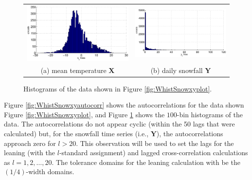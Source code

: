 \documentclass{article}[10pt]
\begin{document}
\begin{figure}[ht]
\begin{tabular}{cc}
\includegraphics[scale=0.5]{WhistlerDailyExample_Xhist.eps} & \includegraphics[scale=0.5]{WhistlerDailyExample_Yhist.eps} \\
(a) mean temperature $\mathbf{X}$ & (b) daily snowfall $\mathbf{Y}$
\end{tabular}
\caption{Histograms of the data shown in Figure \ref{fig:WhistSnowxyplot}.}
\label{fig:WhistSnowxyhist}
\end{figure}

Figure \ref{fig:WhistSnowxyautocorr} shows the autocorrelations for the data shown Figure \ref{fig:WhistSnowxyplot}, and Figure \ref{fig:WhistSnowxyhist} shows the $100$-bin histograms of the data.  The autocorrelations do not appear cyclic (within the 50 lags that were calculated) but, for the snowfall time series (i.e., $\mathbf{Y}$), the autocorrelations approach zero for $l>20$.  This observation will be used to set the lags for the leaning (with the $l$-standard assignment) and lagged cross-correlation calculations as $l=1,2,\ldots,20$.  The tolerance domains for the leaning calculation with be the $(1/4)$-width domains.
\end{document}
